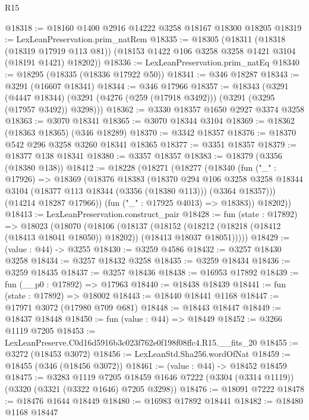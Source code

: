 \begin{lexlean}{R15}
\begin{coremodule}
@18318 := @18160 @1400 @2916 @14222 @3258 @18167 @18300 @18205
@18319 := LexLeanPreservation.prim_natRem
@18335 := @18305
    (@18311
      (@18318 (@18319 @17919 @113 @81))
      (@18153 @1422 @106 @3258 @3258 @1421 @3104 (@18191 @1421) @18202))
@18336 := LexLeanPreservation.prim_natEq
@18340 := @18295 (@18335 (@18336 @17922 @50))
@18341 := @346 @18287
@18343 := @3291 (@16607 @18341)
@18344 := @346 @17966
@18357 := @18343
    (@3291
      (@4447 @18344)
      (@3291 (@4276 (@259 (@17918 @3492))) (@3291 (@3295 (@17957 @3492)) @3298)))
@18362 := @3330 @18357 @1650 @2927 @3374 @3258
@18363 := @3070 @18341
@18365 := @3070 @18344 @3104
@18369 := @18362 (@18363 @18365) (@346 @18289)
@18370 := @3342 @18357
@18376 := @18370 @542 @296 @3258 @3260 @18341 @18365
@18377 := @3351 @18357
@18379 := @18377 @138 @18341
@18380 := @3357 @18357
@18383 := @18379 (@3356 (@18380 @138))
@18412 := @18228
    (@18271
      (@18277
        (@18340
          (fun ("_" : @17926) =>
          @18369
            (@18376
              @18383
              (@18370
                @294
                @106
                @3258
                @3258
                @18344
                @3104
                (@18377 @113 @18344 (@3356 (@18380 @113)))
                (@3364 @18357)))
            (@14214 @18287 @17966))
          (fun ("_" : @17925 @4013) => @18383))
        @18202))
@18413 := LexLeanPreservation.construct_pair
@18428 := fun (state : @17892) =>
  @18023
    (@18070
      (@18106
        (@18137
          (@18152
            (@18212 (@18218 (@18412 (@18413 @18041 @18050)) @18202))
            (@18413 @18037 @18051)))))
@18429 := (value : @44) -> @3255
@18430 := @3259 @4586
@18432 := @3257 @18430 @3258
@18434 := @3257 @18432 @3258
@18435 := @3259 @18434
@18436 := @3259 @18435
@18437 := @3257 @18436
@18438 := @16953 @17892
@18439 := fun (__p0 : @17892) => @17963
@18440 := @18438 @18439
@18441 := fun (state : @17892) => @18002
@18443 := @18440 @18441 @1168
@18447 := @17971 @3072 (@17980 @709 @681)
@18448 := @18443 @18447
@18449 := @18437 @18448
@18450 := fun (value : @44) => @18449
@18452 := @3266 @1119 @7205
@18453 := LexLeanPreserve.C0d16d5916b3c023f762e0f198f08ffc4.R15.__fits_20
@18455 := @3272 (@18453 @3072)
@18456 := LexLeanStd.Sha256.wordOfNat
@18459 := @18455 (@346 (@18456 @3072))
@18461 := (value : @44) -> @18452 @18459
@18475 := @3283
    @1119
    @7205
    @18459
    @1646
    @7222
    (@3304 (@3314 @1119))
    (@3320 (@3321 (@3322 @1646) @7205 @3298))
@18476 := @18091 @7222
@18478 := @18476 @1644 @18449
@18480 := @16983 @17892 @18441
@18482 := @18480 @1168 @18447

\end{coremodule}
\end{lexlean}
